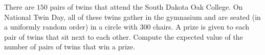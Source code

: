There are $150$ pairs of twins that attend the South Dakota Oak College. On National Twin Day, all of these twins gather in the gymnasium and are seated (in a uniformly random order) in a circle with $300$ chairs. A prize is given to each pair of twins that sit next to each other. Compute the expected value of the number of pairs of twins that win a prize.
